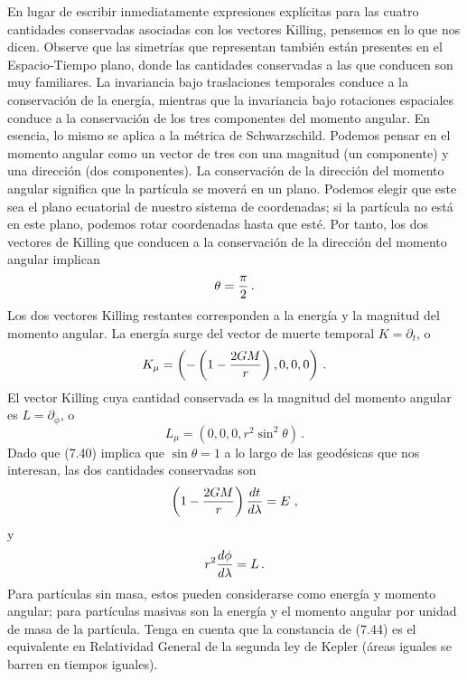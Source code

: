 \documentclass[11pt,b5paper,openany,twoside]{book}
\newcommand{\p}[1]{{\partial_{#1}}}
\begin{document}
En lugar de escribir inmediatamente expresiones explícitas para las cuatro cantidades conservadas asociadas con los vectores Killing, pensemos en lo que nos dicen.
Observe que las simetrías que representan también están presentes en el Espacio-Tiempo plano, donde las cantidades conservadas a las que conducen son muy familiares.
La invariancia bajo traslaciones temporales conduce a la conservación de la energía, mientras que la invariancia bajo rotaciones espaciales conduce a la conservación de los tres componentes del momento angular.
En esencia, lo mismo se aplica a la métrica de Schwarzschild.
Podemos pensar en el momento angular como un vector de tres con una magnitud (un componente) y una dirección (dos componentes).
La conservación de la dirección del momento angular significa que la partícula se moverá en un plano.
Podemos elegir que este sea el plano ecuatorial de nuestro sistema de coordenadas; si la partícula no está en este plano, podemos rotar coordenadas hasta que esté.
Por tanto, los dos vectores de Killing que conducen a la conservación de la dirección del momento angular implican
\begin{equation}
\theta = {\pi\over 2}\,.\label{7.40}
\end{equation}
Los dos vectores Killing restantes corresponden a la energía y la magnitud del momento angular.
La energía surge del vector de muerte temporal $K = \partial_t$, o
\begin{equation}
K_\mu = \left(-\left(1-{{2GM}\over r}\right),0,0,0\right)
\,.\label{7.41}
\end{equation}
El vector Killing cuya cantidad conservada es la magnitud del momento angular es $L = \p\phi$, o
\begin{equation}
L_\mu = \left(0,0,0,r^2\sin^2\theta \right)\,.\label{7.42}
\end{equation}
Dado que (7.40) implica que $\sin\theta = 1$ a lo largo de las geodésicas que nos interesan, las dos cantidades conservadas son
\begin{equation}
\left(1-{{2GM}\over r}\right){{dt}\over{d\lambda}}=E\ ,\label{7.43}
\end{equation}
y
\begin{equation}
r^2{{d\phi}\over{d\lambda}}=L\,.\label{7.44}
\end{equation}
Para partículas sin masa, estos pueden considerarse como energía y momento angular; para partículas masivas son la energía y el momento angular por unidad de masa de la partícula.
Tenga en cuenta que la constancia de (7.44) es el equivalente en Relatividad General de la segunda ley de Kepler (áreas iguales se barren en tiempos iguales).
\end{document}
